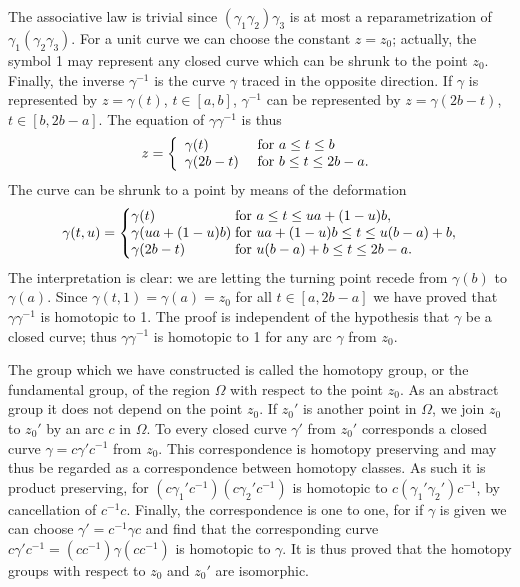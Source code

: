 The associative law is trivial since $(\gamma_1\gamma_2)\gamma_3$ is at most a reparametrization of $\gamma_{1}(\gamma_{2}\gamma_{3})$. For a unit curve we can choose the constant $z = z_0$; actually, the symbol 1 may represent any closed curve which can be shrunk to the point $z_0$. Finally, the inverse $\gamma^{-1}$ is the curve $\gamma$ traced in the opposite direction. If $\gamma$ is represented by $z = \gamma(t)$, $t \in [a,b]$, $\gamma^{-1}$ can be represented by $z = \gamma(2b - t)$, $t \in [b, 2b - a]$. The equation of $\gamma\gamma^{-1}$ is thus
\begin{equation*}
z = \left\{ \begin{array}{l l} \gamma (t) & \text {   for   } a \leq t \leq b \\ \gamma (2 b - t) & \text {   for   } b \leq t \leq 2 b - a. \end{array} \right.
\end{equation*}
The curve can be shrunk to a point by means of the deformation
\begin{equation*}
\gamma(t,u)=\left\{\begin{array}{@{}l@{\;}l@{}}
\gamma(t)&\text{for }a\leq t\leq ua+(1-u)b,\\
\gamma(ua+(1-u)b)&\text{for }ua+(1-u)b\leq t\leq u(b-a)+b,\\
\gamma(2b-t)&\text{for }u(b-a)+b\leq t\leq2b-a.
\end{array}\right.
\end{equation*}
The interpretation is clear: we are letting the turning point recede from $\gamma(b)$ to $\gamma(a)$. Since $\gamma(t,1) = \gamma(a) = z_0$ for all $t \in [a, 2b - a]$ we have proved that $\gamma\gamma^{-1}$ is homotopic to 1. The proof is independent of the hypothesis that $\gamma$ be a closed curve; thus $\gamma\gamma^{-1}$ is homotopic to 1 for any arc $\gamma$ from $z_0$.


The group which we have constructed is called the homotopy group, or the fundamental group, of the region $\Omega$ with respect to the point $z_0$. As an abstract group it does not depend on the point $z_0$. If $z_0'$ is another point in $\Omega$, we join $z_0$ to $z_0'$ by an arc $c$ in $\Omega$. To every closed curve $\gamma'$ from $z_0'$ corresponds a closed curve $\gamma = c\gamma'c^{-1}$ from $z_0$. This correspondence is homotopy preserving and may thus be regarded as a correspondence between homotopy classes. As such it is product preserving, for $(c\gamma_1'c^{-1})(c\gamma_2'c^{-1})$ is homotopic to $c(\gamma_1'\gamma_2')c^{-1}$, by cancellation of $c^{-1}c$. Finally, the correspondence is one to one, for if $\gamma$ is given we can choose $\gamma' = c^{-1}\gamma c$ and find that the corresponding curve $c\gamma'c^{-1} = (cc^{-1})\gamma(cc^{-1})$ is homotopic to $\gamma$. It is thus proved that the homotopy groups with respect to $z_0$ and $z_0'$ are isomorphic.

